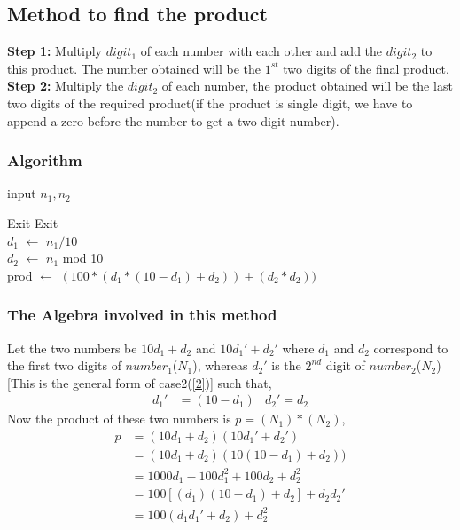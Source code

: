 \documentclass[12pt, a4paper]{article}
\begin{document}
	\subsection{Method to find the product}
	\textbf{Step 1:} Multiply $digit_1$ of each number with each other and add the $digit_2$
	to this product. The number obtained will be the $1^{st}$ two digits of the final product.
	\\
	\textbf{Step 2:} Multiply the $digit_2$ of each number, the product obtained will be the last two digits of the required product(if the product is single digit, we have to append a zero before the number to get a two digit number).
	\subsubsection{Algorithm}
	\begin{algorithm}[H]
		input $n_1, n_2$ 
		\begin{algorithmic}[1]
			\State Exit
			\EndIf
			\State Exit
			\EndIf
			\\
			$d_1$ $\gets$ $n_1/10$ \\ 
			$d_2$ $\gets$ $n_1$ mod 10 \\
			prod $\gets$ $(100*(d_1*(10-d_1)+d_2)) + (d_2*d_2))$ 
		\end{algorithmic}
	\end{algorithm}
	\subsubsection{The Algebra involved in this method}
	Let the two numbers be $10d_1+d_2$ and $10d_1'+d_2'$ where $d_1$ and $d_2$ correspond to the first two digits of $number_1$($N_1$), whereas $d_2'$ is the $2^{nd}$ digit of $number_2$($N_2$)[This is the general form of case2(\ref{2})] such that,
	\begin{align*}
	d_1'&=(10-d_1) & d_2'=d_2
	\end{align*}
	Now the product of these two numbers is $p=(N_1)*(N_2)$,
	\begin{align*}
	p&=(10d_1+d_2)(10d_1'+d_2')\\
	&=(10d_1+d_2)(10(10-d_1)+d_2))\\
	&=1000d_1-100d_1^2+100d_2+d_2^2\\
	&=100[(d_1)(10-d_1)+d_2]+d_2d_2'\\
	&=100(d_1d_1'+d_2)+d_2^2
	\end{align*}
\end{document}
